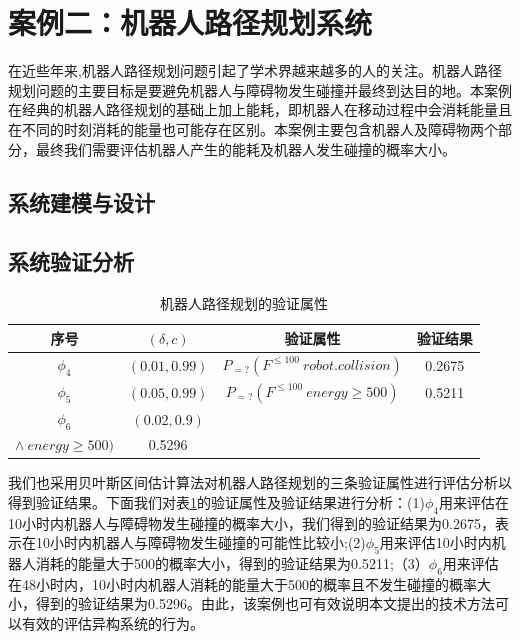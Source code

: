 \section{案例二：机器人路径规划系统}
在近些年来,机器人路径规划问题引起了学术界越来越多的人的关注。机器人路径规划问题的主要目标是要避免机器人与障碍物发生碰撞并最终到达目的地。本案例在经典的机器人路径规划的基础上加上能耗，即机器人在移动过程中会消耗能量且在不同的时刻消耗的能量也可能存在区别。本案例主要包含机器人及障碍物两个部分，最终我们需要评估机器人产生的能耗及机器人发生碰撞的概率大小。
\subsection{系统建模与设计}

\subsection{系统验证分析}
\begin{table}[t]
	\caption{机器人路径规划的验证属性}
	\label{tb:robot}
	\centering
	\begin{tabular}{c c c c}
		\hline
		~序号~ & $(\delta,c)$ & 验证属性 & 验证结果 \\
		\hline
		$\phi_4$ & $(0.01,0.99)$ & $P_{=?}(F^{\leq100}~robot.collision)$ & 0.2675 \\ 
		$\phi_5$ & $(0.05,0.99)$ & $P_{=?}(F^{\leq100}~energy \geq 500)$ & 0.5211 \\
		$\phi_6$ & $(0.02,0.9)$ & 
		\tabincell{c}{$P_{=?}(F^{\leq100}~robot.collision$ \\ $\wedge~energy \geq 500)$} & 0.5296\\
		\hline
	\end{tabular}
\end{table}

我们也采用贝叶斯区间估计算法对机器人路径规划的三条验证属性进行评估分析以得到验证结果。下面我们对表\ref{tb:robot}的验证属性及验证结果进行分析：(1)$\phi_4$用来评估在10小时内机器人与障碍物发生碰撞的概率大小，我们得到的验证结果为0.2675，表示在10小时内机器人与障碍物发生碰撞的可能性比较小;(2)$\phi_5$用来评估10小时内机器人消耗的能量大于500的概率大小，得到的验证结果为0.5211;（3）$\phi_6$用来评估在48小时内，10小时内机器人消耗的能量大于500的概率且不发生碰撞的概率大小，得到的验证结果为0.5296。由此，该案例也可有效说明本文提出的技术方法可以有效的评估异构系统的行为。

